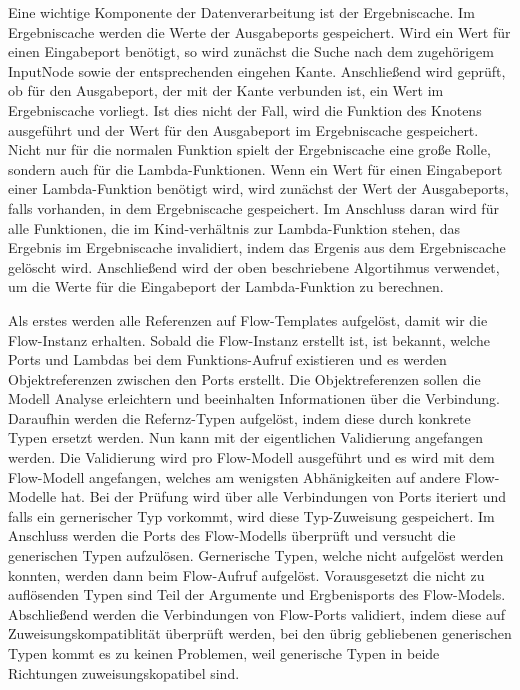 \documentclass{article}
\begin{document}
    Eine wichtige Komponente der Datenverarbeitung ist der Ergebniscache. Im Ergebniscache werden die Werte der Ausgabeports gespeichert.
    Wird ein Wert für einen Eingabeport benötigt, so wird zunächst die Suche nach dem zugehörigem InputNode sowie der entsprechenden eingehen Kante. 
    Anschließend wird geprüft, ob für den Ausgabeport, der mit der Kante verbunden ist, ein Wert im Ergebniscache vorliegt.
    Ist dies nicht der Fall, wird die Funktion des Knotens ausgeführt und der Wert für den Ausgabeport im Ergebniscache gespeichert.\\
    Nicht nur für die normalen Funktion spielt der Ergebniscache eine große Rolle, sondern auch für die Lambda-Funktionen.
    Wenn ein Wert für einen Eingabeport einer Lambda-Funktion benötigt wird, wird zunächst der Wert der Ausgabeports, falls vorhanden, in dem Ergebniscache gespeichert.
    Im Anschluss daran wird für alle Funktionen, die im Kind-verhältnis zur Lambda-Funktion stehen, das Ergebnis im Ergebniscache invalidiert, indem das Ergenis aus dem Ergebniscache gelöscht wird.
    Anschließend wird der oben beschriebene Algortihmus verwendet, um die Werte für die Eingabeport der Lambda-Funktion zu berechnen.

    Als erstes werden alle Referenzen auf Flow-Templates aufgelöst, damit wir die Flow-Instanz erhalten. Sobald die Flow-Instanz erstellt ist, ist bekannt, welche Ports und Lambdas bei dem Funktions-Aufruf existieren und es werden Objektreferenzen zwischen den Ports erstellt.
    Die Objektreferenzen sollen die Modell Analyse erleichtern und beeinhalten Informationen über die Verbindung.
    Daraufhin werden die Refernz-Typen aufgelöst, indem diese durch konkrete Typen ersetzt werden.
    Nun kann mit der eigentlichen Validierung angefangen werden. Die Validierung wird pro Flow-Modell ausgeführt und es wird mit dem Flow-Modell angefangen, welches am wenigsten Abhänigkeiten auf andere Flow-Modelle hat.
    Bei der Prüfung wird über alle Verbindungen von Ports iteriert und falls ein gernerischer Typ vorkommt, wird diese Typ-Zuweisung gespeichert.
    Im Anschluss werden die Ports des Flow-Modells überprüft und versucht die generischen Typen aufzulösen. Gernerische Typen, welche nicht aufgelöst werden konnten, werden dann beim Flow-Aufruf aufgelöst. Vorausgesetzt die nicht zu auflösenden Typen sind Teil der Argumente und Ergbenisports des Flow-Models.
    Abschließend werden die Verbindungen von Flow-Ports validiert, indem diese auf Zuweisungskompatiblität überprüft werden, bei den übrig gebliebenen generischen Typen kommt es zu keinen Problemen, weil generische Typen in beide Richtungen zuweisungskopatibel sind.
\end{document}
